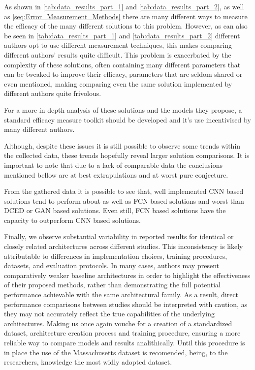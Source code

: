 \documentclass[conference]{IEEEtran}
\begin{document}
As shown in \cref{tab:data_results_part_1} and \cref{tab:data_results_part_2},
as well as \hyperref[seq:Error_Measurement_Methods]{
    \cref{seq:Error_Measurement_Methods}} there are many different ways to measure
the efficacy of the many different solutions to this problem. However, as can
also be seen in \cref{tab:data_results_part_1} and
\cref{tab:data_results_part_2} different authors opt to use different
measurement techniques, this makes comparing different authors' results quite
difficult. This problem is exacerbated by the complexity of these solutions,
often containing many different parameters that can be tweaked to improve their
efficacy, parameters that are seldom shared or even mentioned, making comparing
even the same solution implemented by different authors quite frivolous.

For a more in depth analysis of these solutions and the models they propose, a
standard efficacy measure toolkit should be developed and it's use incentivised
by many different authors.

Although, despite these issues it is still possible to observe some trends
within the collected data, these trends hopefully reveal larger solution
comparisons. It is important to note that due to a lack of comparable data the
conclusions mentioned bellow are at best extrapulations and at worst pure
conjecture.

From the gathered data it is possible to see that, well implemented CNN based
solutions tend to perform about as well as FCN based solutions and worst than
DCED or GAN based solutions. Even still, FCN based solutions have the capacity
to outperform CNN based solutions.

Finally, we observe substantial variability in reported results for identical
or closely related architectures across different studies. This inconsistency
is likely attributable to differences in implementation choices, training
procedures, datasets, and evaluation protocols. In many cases, authors may
present comparatively weaker baseline architectures in order to highlight the
effectiveness of their proposed methods, rather than demonstrating the full
potential performance achievable with the same architectural family. As a
result, direct performance comparisons between studies should be interpreted
with caution, as they may not accurately reflect the true capabilities of the
underlying architectures. Making us once again vouche for a creation of a
standardized dataset, architecture creation process and training procedure,
ensuring a more reliable way to compare models and results analithically. Until
this procedure is in place the use of the Massachusetts dataset is recomended,
being, to the researchers, knowledge the most widly adopted dataset.


\end{document}
